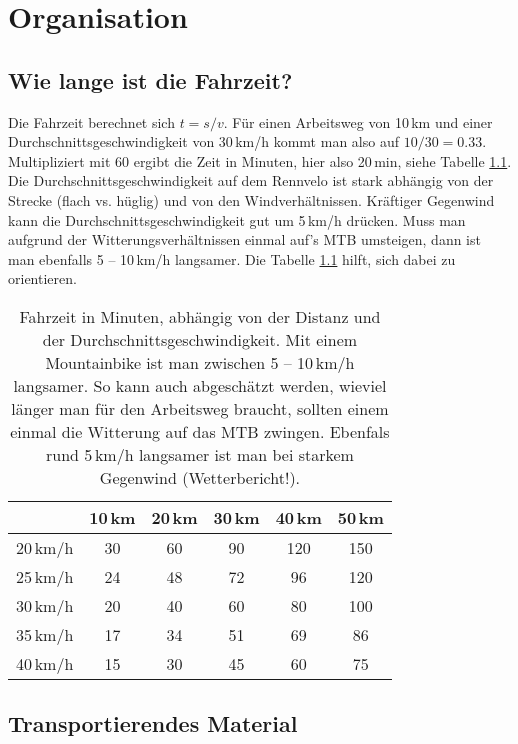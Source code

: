 \documentclass[a4paper,DIV13,BCOR1cm]{scrbook}
\begin{document}
\chapter{Organisation}

\section{Wie lange ist die Fahrzeit?}

Die Fahrzeit berechnet sich $t = s/v$. Für einen Arbeitsweg von 10\,km und einer Durchschnittsgeschwindigkeit von 30\,km/h kommt man also auf $10/30=0.33$.
Multipliziert mit 60 ergibt die Zeit in Minuten, hier also 20\,min, siehe Tabelle \ref{tab:fahrzeit}.
Die Durchschnittsgeschwindigkeit auf dem Rennvelo ist stark abhängig von der Strecke (flach vs. hüglig) und von den Windverhältnissen.
Kräftiger Gegenwind kann die Durchschnittsgeschwindigkeit gut um 5\,km/h drücken.
Muss man aufgrund der Witterungsverhältnissen einmal auf's MTB umsteigen, dann ist man ebenfalls 5 -- 10\,km/h langsamer.
Die Tabelle \ref{tab:fahrzeit} hilft, sich dabei zu orientieren.

\begin{table}
        \centering
        \begin{tabular}{cccccc}
                \toprule
            &	10\,km	&   20\,km	& 30\,km	&   40\,km	& 50\,km    \\
    \midrule
20\,km/h	&   30      &	60	    & 90        &   120	    & 150       \\
25\,km/h	&   24      &	48 &	72 &	96 &	120  \\
30\,km/h	&   20      &	40 & 	60& 	80 &	100 \\
35\,km/h	&   17      &	34 &	51& 	69 &	86 \\
40\,km/h	&   15      &	30 &	45& 	60 &	75 \\
\bottomrule
        \end{tabular}
        \caption{Fahrzeit in Minuten, abhängig von der Distanz und der Durchschnittsgeschwindigkeit.
        Mit einem Mountainbike ist man zwischen 5 -- 10\,km/h langsamer.
        So kann auch abgeschätzt werden, wieviel länger man für den Arbeitsweg braucht,
        sollten einem einmal die Witterung auf das MTB zwingen.
        Ebenfals rund 5\,km/h langsamer ist man bei starkem Gegenwind (Wetterbericht!).}
        \label{tab:fahrzeit}
\end{table}

\section{Transportierendes Material}
\end{document}
